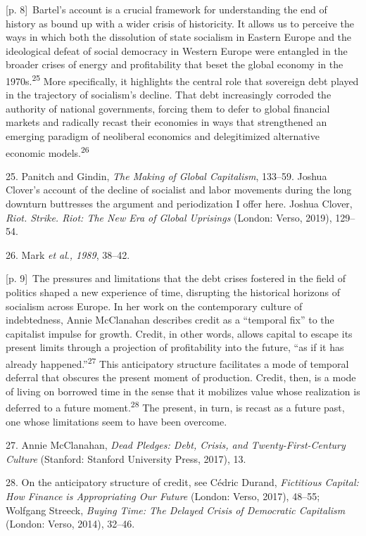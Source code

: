 \documentclass[10pt,a4paper]{article}
\begin{document}
{\scriptsize\color{gray} [p. 8]}\ Bartel’s account is a crucial framework for understanding the end of history as bound up with a wider crisis of historicity. It allows us to perceive the ways in which both the dissolution of state socialism in Eastern Europe and the ideological defeat of social democracy in Western Europe were entangled in the broader crises of energy and profitability that beset the global economy in the 1970s.\nobreak\textsuperscript{25} More specifically, it highlights the central role that sovereign debt played in the trajectory of socialism’s decline. That debt increasingly corroded the authority of national governments, forcing them to defer to global financial markets and radically recast their economies in ways that strengthened an emerging paradigm of neoliberal economics and delegitimized alternative economic models.\nobreak\textsuperscript{26}\par{\small 25. Panitch and Gindin, \textit{The Making of Global Capitalism}, 133–59. Joshua Clover’s account of the decline of socialist and labor movements during the long downturn buttresses the argument and periodization I offer here. Joshua Clover, \textit{Riot. Strike. Riot: The New Era of Global Uprisings} (London: Verso, 2019), 129–54.\par}{\small 26. Mark \textit{et al}.\textit{, 1989}, 38–42.\par}
{\scriptsize\color{gray} [p. 9]}\ The pressures and limitations that the debt crises fostered in the field of politics shaped a new experience of time, disrupting the historical horizons of socialism across Europe. In her work on the contemporary culture of indebtedness, Annie McClanahan describes credit as a “temporal fix” to the capitalist impulse for growth. Credit, in other words, allows capital to escape its present limits through a projection of profitability into the future, “as if it has already happened.”\nobreak\textsuperscript{27} This anticipatory structure facilitates a mode of temporal deferral that obscures the present moment of production. Credit, then, is a mode of living on borrowed time in the sense that it mobilizes value whose realization is deferred to a future moment.\nobreak\textsuperscript{28} The present, in turn, is recast as a future past, one whose limitations seem to have been overcome.\par{\small 27. Annie McClanahan, \textit{Dead Pledges: Debt, Crisis, and Twenty-First-Century Culture} (Stanford: Stanford University Press, 2017), 13.\par}{\small 28. On the anticipatory structure of credit, see Cédric Durand, \textit{Fictitious Capital: How Finance is Appropriating Our Future} (London: Verso, 2017), 48–55; Wolfgang Streeck, \textit{Buying Time: The Delayed Crisis of Democratic Capitalism} (London: Verso, 2014), 32–46.\par}
\end{document}
